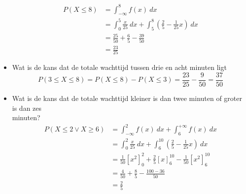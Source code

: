 \documentclass[main.tex]{subfiles}
\begin{document}
\begin{oef}
\begin{itemize}
\[\begin{array}{rl}
      P(X \le 8)
      &= \int_{-\infty}^{8}f(x)\ dx\\
      &= \int_{0}^{5}\frac{x}{25}\ dx + \int_{5}^{8}\left(\frac{2}{5}-\frac{1}{25}x\right)\ dx\\
      &= \frac{25}{50} + \frac{6}{5} - \frac{39}{50}\\
      &= \frac{23}{25}
    \end{array}
    \]
  \item Wat is de kans dat de totale wachttijd tussen drie en acht minuten ligt\\
    \[ P(3 \le X \le 8) = P(X \le 8) - P(X \le 3) = \frac{23}{25}-\frac{9}{50} = \frac{37}{50} \]
  \item Wat is de kans dat de totale wachttijd kleiner is dan twee minuten of groter is dan zes\\
    minuten?
    \[
    \begin{array}{rl}
      P(X \le 2 \vee X \ge 6)
      &= \int_{-\infty}^{2}f(x)\ dx + \int_{6}^{+\infty}f(x)\ dx\\
      &= \int_{0}^{2}\frac{x}{25}\ dx + \int_{6}^{10}\left(\frac{2}{5}-\frac{1}{25}x\right)\ dx\\
      &= \frac{1}{50}\left[x^{2}\right]_{0}^{2} + \frac{2}{5}\left[x\right]_{6}^{10}-\frac{1}{50}\left[x^{2}\right]_{6}^{10}\\
      &= \frac{4}{50} + \frac{8}{5} - \frac{100 -36}{50}\\
      &= \frac{2}{5}
    \end{array}
    \]
  \end{itemize}
\end{oef}
\end{document}
